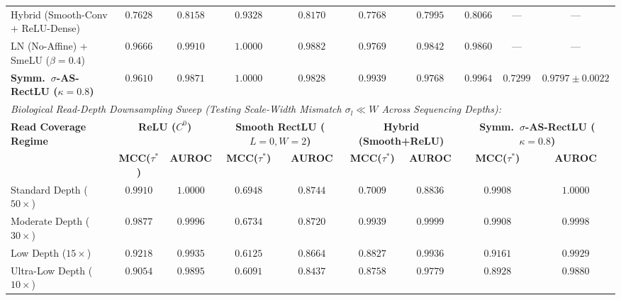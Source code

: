 \documentclass[10pt,a4paper]{article}
\begin{document}
\begin{table}[t]
\begin{tabular}{lccccccccc}
Hybrid (Smooth-Conv + ReLU-Dense) & $0.7628$ & $0.8158$ & $0.9328$ & $0.8170$ & $0.7768$ & $0.7995$ & $0.8066$ & --- & --- \\
LN (No-Affine) + SmeLU ($\beta=0.4$) & $0.9666$ & $\mathbf{0.9910}$ & $\mathbf{1.0000}$ & $\mathbf{0.9882}$ & $0.9769$ & $\mathbf{0.9842}$ & $0.9860$ & --- & --- \\
\textbf{Symm.\ $\sigma$-AS-RectLU ($\kappa=0.8$)} & $\mathbf{0.9610}$ & $\mathbf{0.9871}$ & $\mathbf{1.0000}$ & $\mathbf{0.9828}$ & $\mathbf{0.9939}$ & $\mathbf{0.9768}$ & $\mathbf{0.9964}$ & $\mathbf{0.7299}$ & $\mathbf{0.9797 \pm 0.0022}$ \\
\midrule
\multicolumn{10}{l}{\textit{Biological Read-Depth Downsampling Sweep (Testing Scale-Width Mismatch $\sigma_l \ll W$ Across Sequencing Depths):}} \\
\midrule
\textbf{Read Coverage Regime} & \multicolumn{2}{c}{\textbf{ReLU ($C^0$)}} & \multicolumn{2}{c}{\textbf{Smooth RectLU ($L=0, W=2$)}} & \multicolumn{2}{c}{\textbf{Hybrid (Smooth+ReLU)}} & \multicolumn{3}{c}{\textbf{Symm.\ $\sigma$-AS-RectLU ($\kappa=0.8$)}} \\
\cmidrule(lr){2-3} \cmidrule(lr){4-5} \cmidrule(lr){6-7} \cmidrule(lr){8-10}
& \textbf{MCC($\tau^*$)} & \textbf{AUROC} & \textbf{MCC($\tau^*$)} & \textbf{AUROC} & \textbf{MCC($\tau^*$)} & \textbf{AUROC} & \multicolumn{2}{c}{\textbf{MCC($\tau^*$)}} & \textbf{AUROC} \\
\midrule
Standard Depth ($50\times$) & $0.9910$ & $1.0000$ & $0.6948$ & $0.8744$ & $0.7009$ & $0.8836$ & \multicolumn{2}{c}{$\mathbf{0.9908}$} & $\mathbf{1.0000}$ \\
Moderate Depth ($30\times$) & $0.9877$ & $0.9996$ & $0.6734$ & $0.8720$ & $\mathbf{0.9939}$ & $\mathbf{0.9999}$ & \multicolumn{2}{c}{$\mathbf{0.9908}$} & $\mathbf{0.9998}$ \\
Low Depth ($15\times$) & $0.9218$ & $0.9935$ & $0.6125$ & $0.8664$ & $0.8827$ & $0.9936$ & \multicolumn{2}{c}{$\mathbf{0.9161}$} & $\mathbf{0.9929}$ \\
Ultra-Low Depth ($10\times$) & $0.9054$ & $0.9895$ & $0.6091$ & $0.8437$ & $0.8758$ & $0.9779$ & \multicolumn{2}{c}{$\mathbf{0.8928}$} & $\mathbf{0.9880}$ \\
\bottomrule
\end{tabular}
\end{table}
\end{document}
